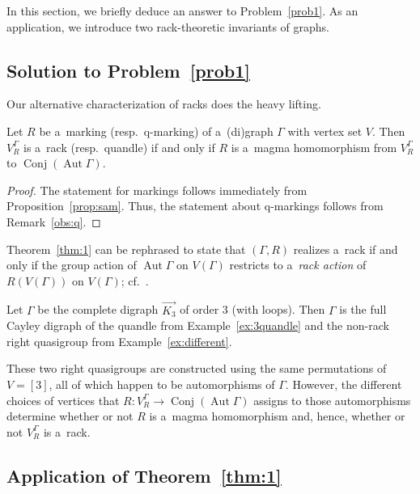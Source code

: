 \documentclass{jonasart}
\DeclareMathOperator{\Aut}{Aut}
\DeclareMathOperator{\Conj}{Conj}
\begin{document}
	In this section, we briefly deduce an answer to Problem~\ref{prob1}. As an application, we introduce two rack-theoretic invariants of graphs.

	\subsection{Solution to Problem~\ref{prob1}}
    
	Our alternative characterization of racks does the heavy lifting.
	\begin{theorem}\label{thm:1}
		Let $R$ be a~marking \textup{(}resp.\ q-marking\textup{)} of a~\textup{(}di\textup{)}graph $\Gamma$ with vertex set $V$. Then $V^\Gamma_R$ is a~rack \textup{(}resp.\ quandle\textup{)} if and only if $R$ is a~magma homomorphism from $V^\Gamma_R$ to $\Conj(\Aut\Gamma)$.
	\end{theorem}

	\begin{proof}
		The statement for markings follows immediately from Proposition~\ref{prop:sam}. Thus, the statement about q-markings follows from Remark~\ref{obs:q}.
	\end{proof}

	\begin{remark}\label{rmk:act}
		Theorem~\ref{thm:1} can be rephrased to state that $(\Gamma,R)$ realizes a~rack if and only if the group action of $\Aut\Gamma$ on $V(\Gamma)$ restricts to a~\emph{rack action} of $R(V(\Gamma))$ on $V(\Gamma)$; cf.~\cite{survey}.
	\end{remark}

	\begin{example}
		Let $\Gamma$ be the complete digraph $\overrightarrow{K_3}$ of order 3 (with loops). Then $\Gamma$ is the full Cayley digraph of the quandle from Example~\ref{ex:3quandle} and the non-rack right quasigroup from Example~\ref{ex:different}.

		These two right quasigroups are constructed using the same permutations of $V=[3]$, all of which happen to be automorphisms of $\Gamma$. However, the different choices of vertices that ${R:V^\Gamma_R\to\Conj(\Aut\Gamma)}$ assigns to those automorphisms determine whether or not $R$ is a~magma homomorphism and, hence, whether or not $V^\Gamma_R$ is a~rack.
	\end{example}

	\subsection{Application of Theorem~\ref{thm:1}}\label{sec:appl}
	
\end{document}
